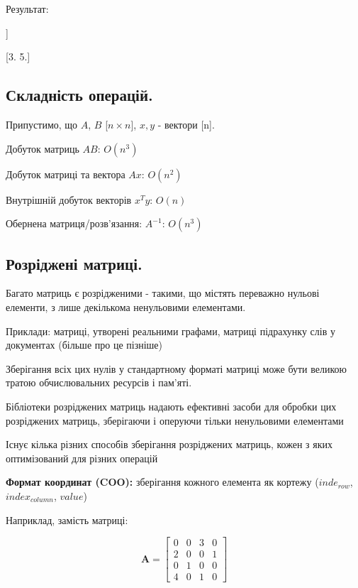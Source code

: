 Результат:

\begin{console}
[[1.5 2.5]
 [1.  2. ]] 

[3. 5.]
\end{console}





\subsection{Складність операцій.}

Припустимо, що $A$, $B$ [$n\times n$], $x,y$ - вектори [n].

Добуток матриць $AB$: $O(n^{3})$

Добуток матриці та вектора $Ax$: $O(n^{2})$

Внутрішній добуток векторів $x^{T}y$: $O(n)$

Обернена матриця/розв'язання: $A^{-1}$: $O(n^{3})$





\subsection{Розріджені матриці.}

Багато матриць є розрідженими - такими, що містять переважно нульові елементи, з лише декількома ненульовими 
елементами.

Приклади: матриці, утворені реальними графами, матриці підрахунку слів у документах 
(більше про це пізніше)

Зберігання всіх цих нулів у стандартному форматі матриці може бути великою тратою 
обчислювальних ресурсів і пам'яті.

Бібліотеки розріджених матриць надають ефективні засоби для обробки цих розріджених 
матриць, зберігаючи і оперуючи тільки ненульовими елементами

Існує кілька різних способів зберігання розріджених матриць, кожен з яких оптимізований для 
різних операцій

\textbf{Формат координат (COO):} зберігання кожного елемента як кортежу
($inde_{row}$, $index_{column}$, $value$)

Наприклад, замість матриці:

$$
\mathbf{A} = \begin{bmatrix}
0 & 0 & 3 & 0 \\
2 & 0 & 0 & 1 \\
0 & 1 & 0 & 0 \\
4 & 0 & 1 & 0
\end{bmatrix}
$$

